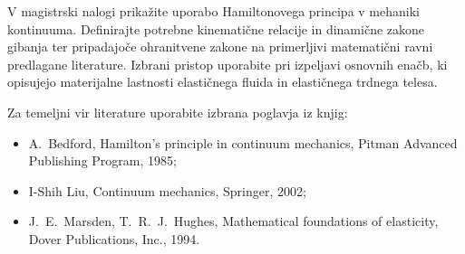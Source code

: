 V magistrski nalogi prikažite uporabo Hamiltonovega principa v mehaniki kontinuuma.
Definirajte potrebne kinematične relacije in dinamične zakone gibanja ter pripadajoče
ohranitvene zakone na primerljivi matematični ravni predlagane literature.
Izbrani pristop uporabite pri izpeljavi osnovnih enačb, ki opisujejo materijalne
lastnosti  elastičnega fluida in elastičnega trdnega telesa. 

Za temeljni vir literature uporabite izbrana poglavja iz knjig:
\begin{itemize}
\item A.~Bedford, Hamilton's principle in continuum mechanics, Pitman Advanced Publishing
Program, 1985;
\item I-Shih Liu, Continuum mechanics, Springer, 2002;
\item J.~E.~Marsden,  T.~R.~J.~Hughes, Mathematical foundations of elasticity, Dover Publications, Inc., 1994.
\end{itemize}
